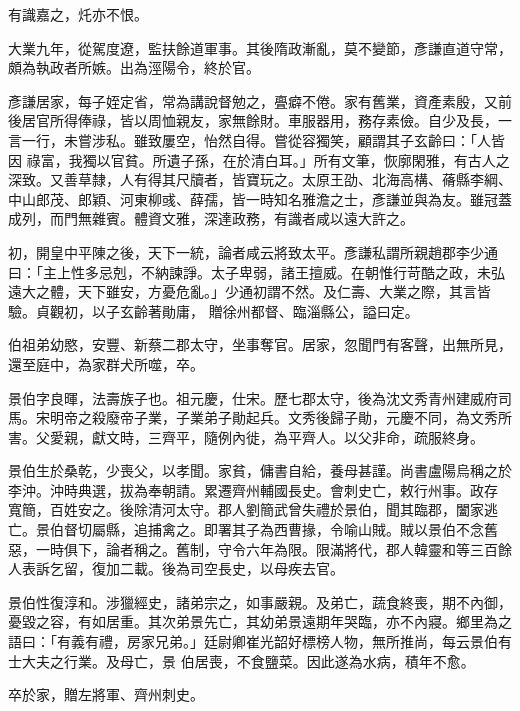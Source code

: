 \begin{pinyinscope}
 有識嘉之，灹亦不恨。



 大業九年，從駕度遼，監扶餘道軍事。其後隋政漸亂，莫不變節，彥謙直道守常，頗為執政者所嫉。出為涇陽令，終於官。



 彥謙居家，每子姪定省，常為講說督勉之，亹癖不倦。家有舊業，資產素殷，又前後居官所得俸祿，皆以周恤親友，家無餘財。車服器用，務存素儉。自少及長，一言一行，未嘗涉私。雖致屢空，怡然自得。嘗從容獨笑，顧謂其子玄齡曰：「人皆因
 祿富，我獨以官貧。所遺子孫，在於清白耳。」所有文筆，恢廓閑雅，有古人之深致。又善草隸，人有得其尺牘者，皆寶玩之。太原王劭、北海高構、蓨縣李綱、中山郎茂、郎穎、河東柳彧、薛孺，皆一時知名雅澹之士，彥謙並與為友。雖冠蓋成列，而門無雜賓。體資文雅，深達政務，有識者咸以遠大許之。



 初，開皇中平陳之後，天下一統，論者咸云將致太平。彥謙私謂所親趙郡李少通曰：「主上性多忌剋，不納諫諍。太子卑弱，諸王擅威。在朝惟行苛酷之政，未弘遠大之體，天下雖安，方憂危亂。」少通初謂不然。及仁壽、大業之際，其言皆驗。貞觀初，以子玄齡著勛庸，
 贈徐州都督、臨淄縣公，謚曰定。



 伯祖弟幼愍，安豐、新蔡二郡太守，坐事奪官。居家，忽聞門有客聲，出無所見，還至庭中，為家群犬所噬，卒。



 景伯字良暉，法壽族子也。祖元慶，仕宋。歷七郡太守，後為沈文秀青州建威府司馬。宋明帝之殺廢帝子業，子業弟子勛起兵。文秀後歸子勛，元慶不同，為文秀所害。父愛親，獻文時，三齊平，隨例內徙，為平齊人。以父非命，疏服終身。



 景伯生於桑乾，少喪父，以孝聞。家貧，傭書自給，養母甚謹。尚書盧陽烏稱之於李沖。沖時典選，拔為奉朝請。累遷齊州輔國長史。會刺史亡，敕行州事。政存
 寬簡，百姓安之。後除清河太守。郡人劉簡武曾失禮於景伯，聞其臨郡，闔家逃亡。景伯督切屬縣，追捕禽之。即署其子為西曹掾，令喻山賊。賊以景伯不念舊惡，一時俱下，論者稱之。舊制，守令六年為限。限滿將代，郡人韓靈和等三百餘人表訴乞留，復加二載。後為司空長史，以母疾去官。



 景伯性復淳和。涉獵經史，諸弟宗之，如事嚴親。及弟亡，蔬食終喪，期不內御，憂毀之容，有如居重。其次弟景先亡，其幼弟景遠期年哭臨，亦不內寢。鄉里為之語曰：「有義有禮，房家兄弟。」廷尉卿崔光韶好標榜人物，無所推尚，每云景伯有士大夫之行業。及母亡，景
 伯居喪，不食鹽菜。因此遂為水病，積年不愈。



 卒於家，贈左將軍、齊州刺史。




\end{pinyinscope}
